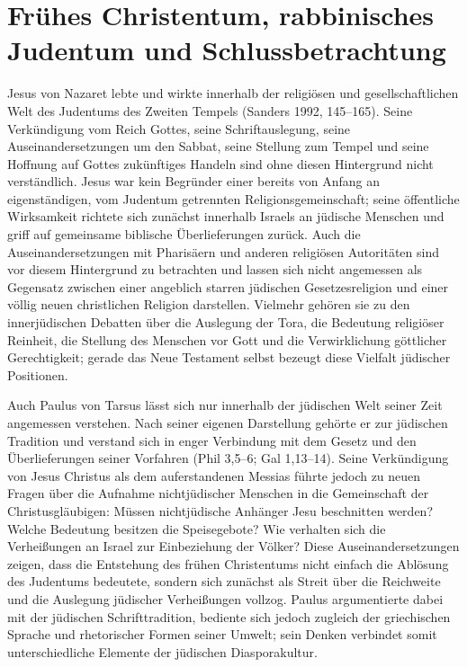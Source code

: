 \documentclass[fontsize=12pt]{mybib}
\begin{document}
\section{Frühes Christentum, rabbinisches Judentum und Schlussbetrachtung}

Jesus von Nazaret lebte und wirkte innerhalb der religiösen und gesellschaftlichen Welt des Judentums des Zweiten Tempels (Sanders 1992, 145–165). Seine Verkündigung vom Reich Gottes, seine Schriftauslegung, seine Auseinandersetzungen um den Sabbat, seine Stellung zum Tempel und seine Hoffnung auf Gottes zukünftiges Handeln sind ohne diesen Hintergrund nicht verständlich. Jesus war kein Begründer einer bereits von Anfang an eigenständigen, vom Judentum getrennten Religionsgemeinschaft; seine öffentliche Wirksamkeit richtete sich zunächst innerhalb Israels an jüdische Menschen und griff auf gemeinsame biblische Überlieferungen zurück. Auch die Auseinandersetzungen mit Pharisäern und anderen religiösen Autoritäten sind vor diesem Hintergrund zu betrachten und lassen sich nicht angemessen als Gegensatz zwischen einer angeblich starren jüdischen Gesetzesreligion und einer völlig neuen christlichen Religion darstellen. Vielmehr gehören sie zu den innerjüdischen Debatten über die Auslegung der Tora, die Bedeutung religiöser Reinheit, die Stellung des Menschen vor Gott und die Verwirklichung göttlicher Gerechtigkeit; gerade das Neue Testament selbst bezeugt diese Vielfalt jüdischer Positionen.

Auch Paulus von Tarsus lässt sich nur innerhalb der jüdischen Welt seiner Zeit angemessen verstehen. Nach seiner eigenen Darstellung gehörte er zur jüdischen Tradition und verstand sich in enger Verbindung mit dem Gesetz und den Überlieferungen seiner Vorfahren (Phil 3,5–6; Gal 1,13–14). Seine Verkündigung von Jesus Christus als dem auferstandenen Messias führte jedoch zu neuen Fragen über die Aufnahme nichtjüdischer Menschen in die Gemeinschaft der Christusgläubigen: Müssen nichtjüdische Anhänger Jesu beschnitten werden? Welche Bedeutung besitzen die Speisegebote? Wie verhalten sich die Verheißungen an Israel zur Einbeziehung der Völker? Diese Auseinandersetzungen zeigen, dass die Entstehung des frühen Christentums nicht einfach die Ablösung des Judentums bedeutete, sondern sich zunächst als Streit über die Reichweite und die Auslegung jüdischer Verheißungen vollzog. Paulus argumentierte dabei mit der jüdischen Schrifttradition, bediente sich jedoch zugleich der griechischen Sprache und rhetorischer Formen seiner Umwelt; sein Denken verbindet somit unterschiedliche Elemente der jüdischen Diasporakultur.
\end{document}
